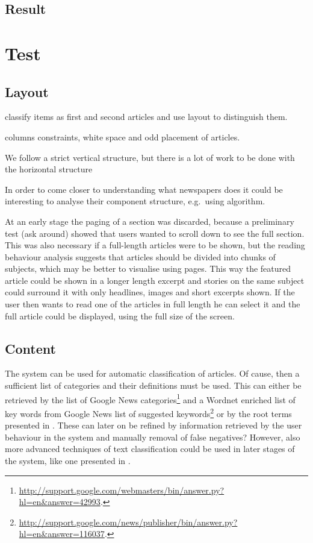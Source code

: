 \subsection{Result}

\section{Test}

\subsection{Layout}

classify items as first and second articles and use layout to distinguish them.

columns constraints, white space and odd placement of articles.

We follow a strict vertical structure, but there is a lot of work to be done with the horizontal structure

In order to come closer to understanding what newspapers does it could be interesting to analyse their component structure, e.g.\ using \cite{00953970.pdf} algorithm.

At an early stage the paging of a section was discarded, because a preliminary test (ask around) showed that users wanted to scroll down to see the full section. This was also necessary if a full-length articles were to be shown, but the reading behaviour analysis suggests that articles should be divided into chunks of subjects, which may be better to visualise using pages. This way the featured article could be shown in a longer length excerpt and stories on the same subject could surround it with only headlines, images and short excerpts shown. If the user then wants to read one of the articles in full length he can select it and the full article could be displayed, using the full size of the screen.%

\subsection{Content}
The system can be used for automatic classification of articles. Of cause, then a sufficient list of categories and their definitions must be used. This can either be retrieved by the list of Google News categories\footnote{\url{http://support.google.com/webmasters/bin/answer.py?hl=en&answer=42993}.} and a Wordnet enriched list of key words from Google News list of suggested keywords\footnote{\url{http://support.google.com/news/publisher/bin/answer.py?hl=en&answer=116037}.} or by the root terms presented in \cite{10-1-1-19-5583}. These can later on be refined by information retrieved by the user behaviour in the system and manually removal of false negatives? However, also more advanced techniques of text classification could be used in later stages of the system, like one presented in \cite{Evaluating-a-User-Model-Based-Personalisation-Architecture-for-Digital-News-Services.pdf}.

